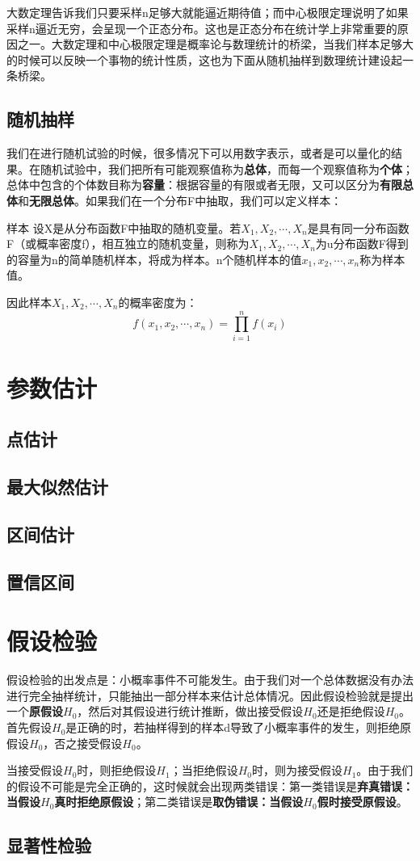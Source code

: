 大数定理告诉我们只要采样n足够大就能逼近期待值；而中心极限定理说明了如果采样n逼近无穷，会呈现一个正态分布。这也是正态分布在统计学上非常重要的原因之一。大数定理和中心极限定理是概率论与数理统计的桥梁，当我们样本足够大的时候可以反映一个事物的统计性质，这也为下面从随机抽样到数理统计建设起一条桥梁。

\subsection{随机抽样}
我们在进行随机试验的时候，很多情况下可以用数字表示，或者是可以量化的结果。在随机试验中，我们把所有可能观察值称为\textbf{总体}，而每一个观察值称为\textbf{个体}；总体中包含的个体数目称为\textbf{容量}：根据容量的有限或者无限，又可以区分为\textbf{有限总体}和\textbf{无限总体}。如果我们在一个分布F中抽取，我们可以定义样本：
\begin{definition}{样本}
    设X是从分布函数F中抽取的随机变量。若$X_1,X_2,\cdots,X_n$是具有同一分布函数F（或概率密度f），相互独立的随机变量，则称为$X_1,X_2,\cdots,X_n$为u分布函数F得到的容量为n的简单随机样本，将成为样本。n个随机样本的值$x_1,x_2,\cdots,x_n$称为样本值。
\end{definition}
因此样本$X_1,X_2,\cdots,X_n$的概率密度为：
\begin{equation}
    f(x_1,x_2,\cdots,x_n)=\prod_{i=1}^n f(x_i)
\end{equation}

\section{参数估计}
\subsection{点估计}
\subsection{最大似然估计}
\subsection{区间估计}
\subsection{置信区间}

\section{假设检验}
假设检验的出发点是：小概率事件不可能发生。由于我们对一个总体数据没有办法进行完全抽样统计，只能抽出一部分样本来估计总体情况。因此假设检验就是提出一个\textbf{原假设$H_0$}，然后对其假设进行统计推断，做出接受假设$H_0$还是拒绝假设$H_0$。首先假设$H_0$是正确的时，若抽样得到的样本d导致了小概率事件的发生，则拒绝原假设$H_0$，否之接受假设$H_0$。

当接受假设$H_0$时，则拒绝假设$H_1$；当拒绝假设$H_0$时，则为接受假设$H_1$。由于我们的假设不可能是完全正确的，这时候就会出现两类错误：第一类错误是\textbf{弃真错误：当假设$H_0$真时拒绝原假设}；第二类错误是\textbf{取伪错误：当假设$H_0$假时接受原假设}。

\subsection{显著性检验}